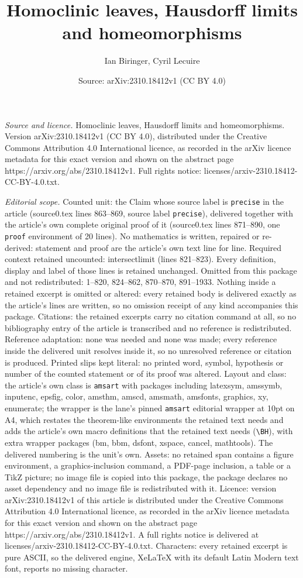 \documentclass[10pt,a4paper]{amsart}
\title[Homoclinic leaves, Hausdorff limits and homeomorphisms]{Homoclinic leaves, Hausdorff limits and homeomorphisms}
\author{Ian Biringer, Cyril Lecuire}
\date{Source: arXiv:2310.18412v1 (CC BY 4.0)}
\begin{document}
\maketitle

\noindent\emph{Source and licence.} Homoclinic leaves, Hausdorff limits and homeomorphisms. Version arXiv:2310.18412v1 (CC BY 4.0), distributed under the Creative Commons Attribution 4.0 International licence, as recorded in the arXiv licence metadata for this exact version and shown on the abstract page https://arxiv.org/abs/2310.18412v1. Full rights notice: licenses/arxiv-2310.18412-CC-BY-4.0.txt.\par\smallskip

\noindent\textit{Editorial scope.} Counted unit: the Claim whose source label is \texttt{precise} in the article (source0.tex lines 863--869, source label \texttt{precise}), delivered together with the article's own complete original proof of it (source0.tex lines 871--890, one \texttt{proof} environment of 20 lines). No mathematics is written, repaired or re-derived: statement and proof are the article's own text line for line. Required context retained uncounted: intersectlimit (lines 821--823). Every definition, display and label of those lines is retained unchanged. Omitted from this package and not redistributed: 1--820, 824--862, 870--870, 891--1933. Nothing inside a retained excerpt is omitted or altered: every retained body is delivered exactly as the article's lines are written, so no omission receipt of any kind accompanies this package. Citations: the retained excerpts carry no citation command at all, so no bibliography entry of the article is transcribed and no reference is redistributed. Reference adaptation: none was needed and none was made; every reference inside the delivered unit resolves inside it, so no unresolved reference or citation is produced. Printed slips kept literal: no printed word, symbol, hypothesis or number of the counted statement or of its proof was altered. Layout and class: the article's own class is \texttt{amsart} with packages including latexsym, amssymb, inputenc, epsfig, color, amsthm, amscd, amsmath, amsfonts, graphics, xy, enumerate; the wrapper is the lane's pinned \texttt{amsart} editorial wrapper at 10pt on A4, which restates the theorem-like environments the retained text needs and adds the article's own macro definitions that the retained text needs (\texttt{\textbackslash BH}), with extra wrapper packages (bm, bbm, dsfont, xspace, cancel, mathtools). The delivered numbering is the unit's own. Assets: no retained span contains a figure environment, a graphics-inclusion command, a PDF-page inclusion, a table or a TikZ picture; no image file is copied into this package, the package declares no asset dependency and no image file is redistributed with it. Licence: version arXiv:2310.18412v1 of this article is distributed under the Creative Commons Attribution 4.0 International licence, as recorded in the arXiv licence metadata for this exact version and shown on the abstract page https://arxiv.org/abs/2310.18412v1. A full rights notice is delivered at licenses/arxiv-2310.18412-CC-BY-4.0.txt. Characters: every retained excerpt is pure ASCII, so the delivered engine, XeLaTeX with its default Latin Modern text font, reports no missing character.
\end{document}
